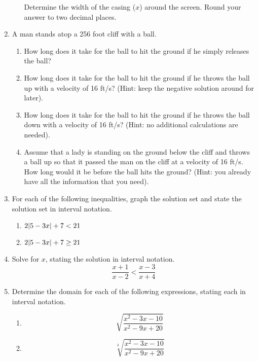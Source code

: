 \documentclass[letterpaper,12pt,fleqn]{article}
\begin{document}
\begin{enumerate}
\begin{enumerate}
    Determine the width of the casing ($x$) around the screen. Round your
    answer to two decimal places.
  \end{enumerate}
\newpage
\item A man stands atop a 256 foot cliff with a ball.
  \begin{enumerate}
  \item How long does it take for the ball to hit the ground if he simply
    releases the ball?

  \item How long does it take for the ball to hit the ground if he throws the
    ball up with a velocity of 16 ft/s? (Hint: keep the negative solution
    around for later).

  \item How long does it take for the ball to hit the ground if he throws the
    ball down with a velocity of 16 ft/s? (Hint: no additional calculations
    are needed).

  \item Assume that a lady is standing on the ground below the cliff and throws
    a ball up so that it passed the man on the cliff at a velocity of 16 ft/s.
    How long would it be before the ball hits the ground? (Hint: you already
    have all the information that you need).
\end{enumerate}

\item For each of the following inequalities, graph the solution set and
  state the solution set in interval notation.
  \begin{enumerate}
  \item $2\lvert5-3x\rvert+7<21$
  \item $2\lvert5-3x\rvert+7\ge21$
  \end{enumerate}

\item Solve for $x$, stating the solution in interval notation.
  \[\frac{x+1}{x-2}<\frac{x-3}{x+4}\]

\item Determine the domain for each of the following expressions, stating each
  in interval notation.
  \begin{enumerate}
    \item \[\sqrt{\frac{x^2-3x-10}{x^2-9x+20}}\]
    \item \[\sqrt[3]{\frac{x^2-3x-10}{x^2-9x+20}}\]
  \end{enumerate}
\end{enumerate}
  
\end{document}
